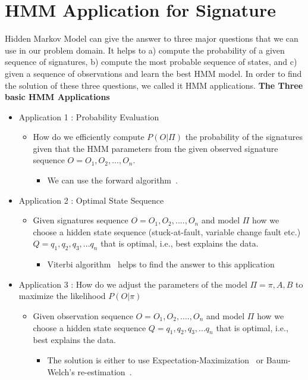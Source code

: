 \section{HMM Application for Signature}
Hidden Markov Model can give the answer to three major questions that we can use in our problem domain. It helps to a) compute the probability of a given sequence of signatures, b) compute the most probable sequence of states, and c) given a sequence of observations and learn the best HMM model.
In order to find the solution of these three questions, we called it HMM applications.
\textbf{The Three basic HMM Applications}
\begin{itemize}
\item Application 1 : Probability Evaluation
 \begin{itemize}
 \item How do we efficiently compute $P(O|\Pi)$ the probability of the signatures given that the HMM parameters from the given observed signature sequence $O = {O_1, O_2,...,O_n}$.
 
  \begin{itemize}
  \item We can use the forward algorithm~\cite{ghahramani1996factorial}.
  \end{itemize}
 \end{itemize}
\end{itemize}
\begin{itemize}
\item Application 2 : Optimal State Sequence
 \begin{itemize}
 \item Given signatures sequence $O = {O_1, O_2,....,}O_n$ and model $\Pi$ how we choose a hidden state sequence (stuck-at-fault, variable change fault etc.) $Q={q_1,q_2,q_3,...q_n}$
that is optimal, i.e., best explains the data. 
  \begin{itemize}
  \item Viterbi algorithm~\cite{forney1973viterbi} helps to find the answer to this application
  \end{itemize}
 \end{itemize}
\end{itemize}
\begin{itemize}
\item Application 3 : How do we adjust the parameters of the model $\Pi = {\pi, A, B}$ to maximize the likelihood $P(O|\pi)$ 
 \begin{itemize}
 \item Given observation sequence $O = {O_1, O_2,....,}O_n$ and model $\Pi$ how we choose a hidden state sequence $Q={q_1,q_2,q_3,...q_n}$
that is optimal, i.e., best explains the data. 
  \begin{itemize}
  \item The solution is either to use Expectation-Maximization~\cite{moon1996expectation} or Baum-Welch’s re-estimation~\cite{leggetter1995maximum}.
  \end{itemize}
 \end{itemize}
\end{itemize}


